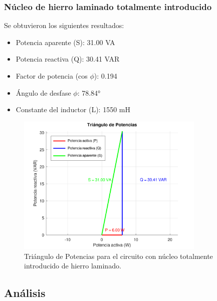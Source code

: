 \documentclass{article}
\begin{document}
                    \subsubsection{Núcleo de hierro laminado totalmente introducido}

                            Se obtuvieron los siguientes resultados:
                        \begin{itemize}
                            \item Potencia aparente (S): 31.00 VA
                            \item Potencia reactiva (Q): 30.41 VAR
                            \item Factor de potencia (cos $\phi$): 0.194
                            \item Ángulo de desfase $\phi$: 78.84°
                            \item Constante del inductor (L): 1550 mH
                        \end{itemize}

                        \begin{figure}[H]
                            \centering
                            \includegraphics[width=0.8\textwidth]{graficoTotalHierroLaminado.png}
                            \caption{Triángulo de Potencias para el circuito con núcleo totalmente introducido de hierro laminado.}
                            \label{fig:graficoTotalHierroLaminado}
                        \end{figure}
            
                        
        \subsection{Análisis}
        
\end{document}
